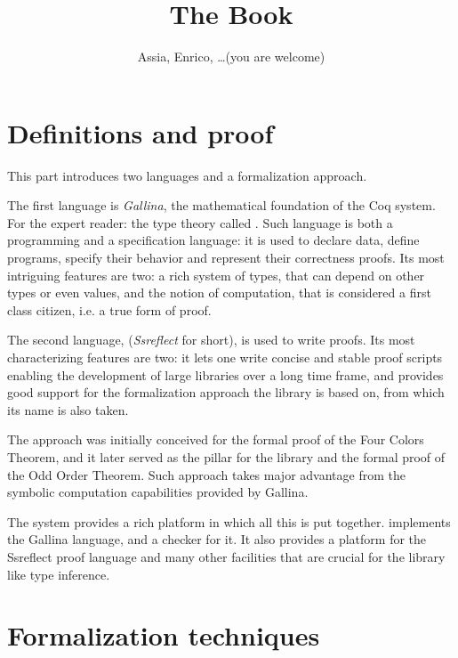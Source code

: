 \documentclass{book}
\title{The Book}
\author{Assia, Enrico, \ldots (you are welcome)}
\begin{document}
\maketitle
\tableofcontents{}

% 



\part{Definitions and proof}

This part introduces two languages and a formalization approach.

The first language is \emph{Gallina}, the mathematical foundation of the Coq
system.  For the expert reader: the type theory called \mcbCIC{}.  Such
language is both a programming and a specification language: it is used to
declare data, define programs, specify their behavior and represent their
correctness proofs.  Its most intriguing features are two: a rich system of
types, that can depend on other types or even values, and the notion of
computation, that is considered a first class citizen, i.e. a true form of
proof.

The second language, \mcbSSR{} (\emph{Ssreflect} for short), is used to write
proofs.  Its most characterizing features are two: it lets one write
concise and stable proof scripts enabling the development of large
libraries over a long time frame, and provides good support for the
formalization approach the \mcbMC{} library is based on, from which
its name is also taken.

The \emph{\mcbSSR{}} approach was initially conceived for the formal proof
of the Four Colors Theorem, and it later served as the pillar for
the \mcbMC{} library and the formal proof of the Odd Order Theorem.
Such approach takes major advantage from the symbolic computation
capabilities provided by Gallina.

The \Coq{} system provides a rich platform in which all this is
put together.  \Coq{} implements the Gallina language, and a checker for it.
It also provides a platform for the Ssreflect proof language and
many other facilities that are crucial for the \mcbMC{} library like
type inference.






\part{Formalization techniques}
\end{document}
